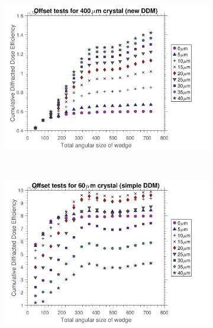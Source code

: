 \begin{figure}
    \ContinuedFloat
    \begin{subfigure}[b]{1\textwidth}
        \centering
        \includegraphics[width=\textwidth]{figures/dwd/OffsetSimulationDDMnewCrystSize400.pdf}
        \caption{}
        \label{fig:Offset simulations 400 - Increasing Eta}
    \end{subfigure}
    \\
    \begin{subfigure}[b]{1\textwidth}
        \centering
        \includegraphics[width=\textwidth]{figures/dwd/OffsetSimulationDDMsimpleCrystSize60.pdf}
        \caption{}
        \label{fig:Offset simulations 60 - Simple Eta}
    \end{subfigure}
\end{figure}
